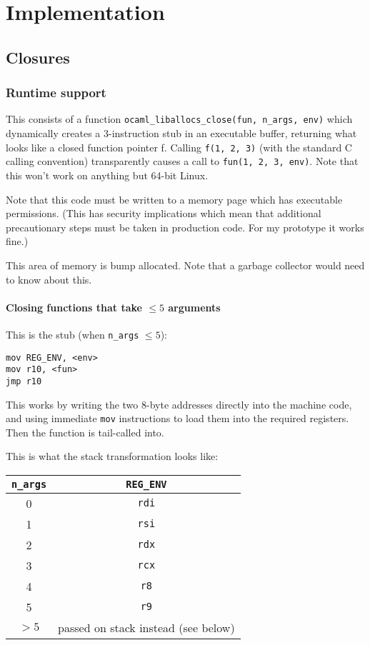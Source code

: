 \documentclass[12pt,a4paper,twoside,openright]{report}
\begin{document}


\chapter{Implementation}

\section{Closures}

\subsection{Runtime support}

This consists of a function \lstinline{ocaml_liballocs_close(fun, n_args, env)}
which dynamically creates a 3-instruction stub in an executable buffer,
returning what looks like a closed function pointer f. Calling
\lstinline{f(1, 2, 3)}
(with the standard C calling convention) transparently causes a call to
\lstinline{fun(1, 2, 3, env)}.
Note that this won't work on anything but 64-bit Linux.

Note that this code must be written to a memory page which has executable permissions. (This has security implications which mean that additional precautionary steps must be taken in production code. For my prototype it works fine.)

This area of memory is bump allocated. Note that a garbage collector would need to know about this.

\subsubsection{Closing functions that take $\le 5$ arguments}

This is the stub (when \lstinline{n_args} $\le 5$):

\begin{lstlisting}
mov REG_ENV, <env>
mov r10, <fun>
jmp r10
\end{lstlisting}

This works by writing the two 8-byte addresses directly into the machine code, and using immediate \lstinline{mov} instructions to load them into the required registers. Then the function is tail-called into.

This is what the stack transformation looks like: %

\begin{tabular}{ c | c }
  \lstinline!n_args! & \lstinline!REG_ENV! \\
  \hline
  0 & \lstinline!rdi! \\
  1 & \lstinline!rsi! \\
  2 & \lstinline!rdx! \\
  3 & \lstinline!rcx! \\
  4 & \lstinline!r8! \\
  5 & \lstinline!r9! \\
  $> 5$ & passed on stack instead (see below) \\
\end{tabular}
\end{document}
